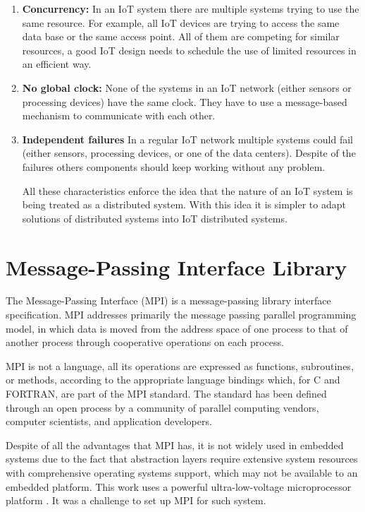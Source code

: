 \begin{enumerate}
\item \textbf{Concurrency:}
In an IoT system there are multiple systems trying to use the same resource.
For example, all IoT devices are trying to access the same data base or
the same access point. All of them are competing for similar resources, a
good IoT design needs to schedule the use of limited resources in an efficient
way.

\item \textbf{No global clock:}
None of the systems in an IoT network (either sensors or processing devices)
have the same clock. They have to use a message-based mechanism to communicate
with each other. 

\item \textbf{Independent failures}
In a regular IoT network multiple systems could fail (either sensors,
processing devices, or one of the data centers). Despite of the failures others
components should keep working without any problem.

All these characteristics enforce the idea that the nature of an IoT system is
being treated as a distributed system. With this idea it is simpler to adapt
solutions of distributed systems into IoT distributed systems.

\end{enumerate}

\section{Message-Passing Interface Library}
\noindent

The Message-Passing Interface (MPI) is a message-passing library interface
specification\cite{MPI-standard}. MPI addresses primarily the message passing
parallel programming model, in which data is moved from the address space of
one process to that of another process through cooperative operations on each
process.

MPI is not a language, all its operations are expressed as functions,
subroutines, or methods, according to the appropriate language bindings which,
for C and FORTRAN, are part of the MPI standard. The standard has been defined
through an open process by a community of parallel computing vendors, computer
scientists, and application developers.

Despite of all the advantages that MPI has, it is not widely used in embedded
systems due to the fact that abstraction layers require extensive system
resources with comprehensive operating systems support, which may not be
available to an embedded platform. This work uses a powerful ultra-low-voltage
microprocessor platform \cite{minnowboard}. It was a challenge to set up MPI
for such system.

